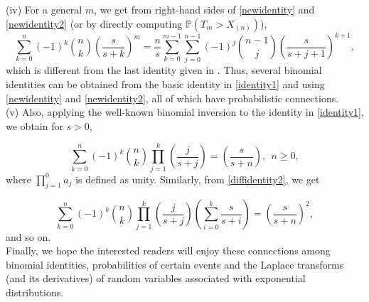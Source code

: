 \documentclass[11pt]{amsart}
\numberwithin{equation}{section}
\begin{document}
(iv) For a general $m$, we get from right-hand sides of \eqref{newidentity} and \eqref{newidentity2} (or by directly computing $\mathbb{P}(T_{m}>X_{(n)})$),
\begin{equation*}
 \sum_{k=0}^{n}(-1)^{k}\binom{n}{k}\left(\frac{s}{s+k}\right)^{m}=\frac{n}{s}\sum_{k=0}^{m-1}\sum_{j=0}^{n-1}(-1)^{j}\binom{n-1}{j}\left(\frac{s}{s+j+1}\right)^{k+1},
\end{equation*}
which is different from the last identity given in \cite{peter}.
 Thus, several binomial identities can be obtained from the basic identity  in \eqref{identity1} and using \eqref{newidentity}  and \eqref{newidentity2}, all of which have probabilistic connections.\\ 

(v) Also, applying the well-known binomial inversion to the identity in \eqref{identity1}, we obtain for $s>0$,

\begin{equation}
 \sum_{k=0}^{n}(-1)^{k}\binom{n}{k}\prod_{j=1}^{k}\left(\frac{j}{s+j}\right)=\left(\frac{s}{s+n}\right),~~n\geq 0,
\end{equation}
where $\prod_{j=1}^{0}a_{j}$ is defined as unity. Similarly, from \eqref{diffidentity2}, we get

\begin{equation}
 \sum_{k=0}^{n}(-1)^{k}\binom{n}{k}\prod_{j=1}^{k}\left(\frac{j}{s+j}\right)\left(\sum_{i=0}^{k}\frac{s}{s+i}\right)=\left(\frac{s}{s+n}\right)^{2},
\end{equation}
and so on.\\ 
 Finally,  we hope the interested readers will enjoy these connections among binomial identities, probabilities of certain events and the Laplace transforms (and its derivatives) of  random variables associated with exponential distributions.
\printbibliography
\end{document}
